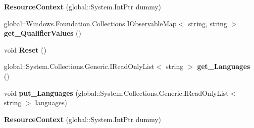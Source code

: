 \begin{DoxyCompactItemize}
{\bfseries Resource\+Context} (global\+::\+System.\+Int\+Ptr dummy)
\item 
\mbox{\label{class_windows_1_1_application_model_1_1_resources_1_1_core_1_1_resource_context_ac228527597261c45581d0c380d6339bd}} 
global\+::\+Windows.\+Foundation.\+Collections.\+I\+Observable\+Map$<$ string, string $>$ {\bfseries get\+\_\+\+Qualifier\+Values} ()
\item 
\mbox{\label{class_windows_1_1_application_model_1_1_resources_1_1_core_1_1_resource_context_a8d2f7782f2b1b6983c33b2297f40b075}} 
void {\bfseries Reset} ()
\item 
\mbox{\label{class_windows_1_1_application_model_1_1_resources_1_1_core_1_1_resource_context_a56ecf1f243ff7d36fb0a7621f3016c07}} 
global\+::\+System.\+Collections.\+Generic.\+I\+Read\+Only\+List$<$ string $>$ {\bfseries get\+\_\+\+Languages} ()
\item 
\mbox{\label{class_windows_1_1_application_model_1_1_resources_1_1_core_1_1_resource_context_aeb5ce93158d04ebbec8c22b384409285}} 
void {\bfseries put\+\_\+\+Languages} (global\+::\+System.\+Collections.\+Generic.\+I\+Read\+Only\+List$<$ string $>$ languages)
\item 
\mbox{\label{class_windows_1_1_application_model_1_1_resources_1_1_core_1_1_resource_context_a718c064119f7ea5fd82856c6423dad71}} 
{\bfseries Resource\+Context} (global\+::\+System.\+Int\+Ptr dummy)
\end{DoxyCompactItemize}
